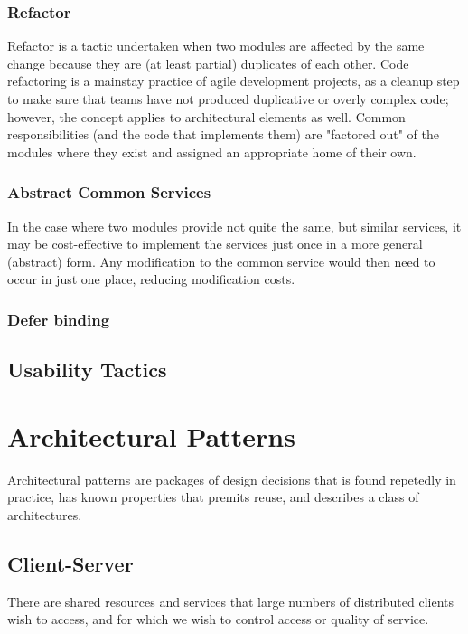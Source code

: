 \documentclass{report}
\begin{document}
\subsubsection{Refactor}
Refactor is a tactic undertaken when two modules are affected by the same change because they are (at least partial) duplicates of each other. Code refactoring is a mainstay practice of agile development projects, as a cleanup step to make sure that teams have not produced duplicative or overly complex code; however, the concept applies to architectural elements as well. Common responsibilities (and the code that implements them) are "factored out" of the modules where they exist and assigned an appropriate home of their own.

\subsubsection{Abstract Common Services}
In the case where two modules provide not quite the same, but similar services, it may be cost-effective to implement the services just once in a more general (abstract) form. Any modification to the common service would then need to occur in just one place, reducing modification costs.



\subsubsection{Defer binding}



\subsection{Usability Tactics}



\section{Architectural Patterns}
Architectural patterns are packages of design decisions that is found repetedly in practice, has known properties that premits reuse, and describes a class of architectures.

\subsection{Client-Server}
There are shared resources and services that large numbers of distributed clients wish to access, and for which we wish to control access or quality of service.
\end{document}
